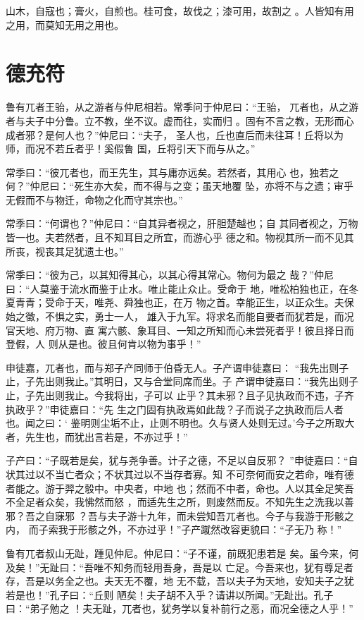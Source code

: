 \documentclass[a4paper,12pt,UTF8,twoside]{ctexbook}
\begin{document}
山木，自寇也；膏火，自煎也。桂可食，故伐之；漆可用，故割之 。人皆知有用之用，而莫知无用之用也。

\section{德充符}

鲁有兀者王骀，从之游者与仲尼相若。常季问于仲尼曰：“王骀， 兀者也，从之游者与夫子中分鲁。立不教，坐不议。虚而往，实而归 。固有不言之教，无形而心成者邪？是何人也？”仲尼曰：“夫子， 圣人也，丘也直后而未往耳！丘将以为师，而况不若丘者乎！奚假鲁 国，丘将引天下而与从之。”

常季曰：“彼兀者也，而王先生，其与庸亦远矣。若然者，其用心 也，独若之何？”仲尼曰：“死生亦大矣，而不得与之变；虽天地覆 坠，亦将不与之遗；审乎无假而不与物迁，命物之化而守其宗也。”

常季曰：“何谓也？”仲尼曰：“自其异者视之，肝胆楚越也；自 其同者视之，万物皆一也。夫若然者，且不知耳目之所宜，而游心乎 德之和。物视其所一而不见其所丧，视丧其足犹遗土也。”

常季曰：“彼为己，以其知得其心，以其心得其常心。物何为最之 哉？”仲尼曰：“人莫鉴于流水而鉴于止水。唯止能止众止。受命于 地，唯松柏独也正，在冬夏青青；受命于天，唯尧、舜独也正，在万 物之首。幸能正生，以正众生。夫保始之徵，不惧之实，勇士一人， 雄入于九军。将求名而能自要者而犹若是，而况官天地、府万物、直 寓六骸、象耳目、一知之所知而心未尝死者乎！彼且择日而登假，人 则从是也。彼且何肯以物为事乎！”

申徒嘉，兀者也，而与郑子产同师于伯昏无人。子产谓申徒嘉曰： “我先出则子止，子先出则我止。”其明日，又与合堂同席而坐。子 产谓申徒嘉曰：“我先出则子止，子先出则我止。今我将出，子可以 止乎？其未邪？且子见执政而不违，子齐执政乎？”申徒嘉曰：“先 生之门固有执政焉如此哉？子而说子之执政而后人者也。闻之曰：‘ 鉴明则尘垢不止，止则不明也。久与贤人处则无过。’今子之所取大 者，先生也，而犹出言若是，不亦过乎！”

子产曰：“子既若是矣，犹与尧争善。计子之德，不足以自反邪？ ”申徒嘉曰：“自状其过以不当亡者众；不状其过以不当存者寡。知 不可奈何而安之若命，唯有德者能之。游于羿之彀中。中央者，中地 也；然而不中者，命也。人以其全足笑吾不全足者众矣，我怫然而怒 ，而适先生之所，则废然而反。不知先生之洗我以善邪？吾之自寐邪 ？吾与夫子游十九年，而未尝知吾兀者也。今子与我游于形骸之内， 而子索我于形骸之外，不亦过乎！”子产蹴然改容更貌曰：“子无乃 称！”

鲁有兀者叔山无趾，踵见仲尼。仲尼曰：“子不谨，前既犯患若是 矣。虽今来，何及矣！”无趾曰：“吾唯不知务而轻用吾身，吾是以 亡足。今吾来也，犹有尊足者存，吾是以务全之也。夫天无不覆，地 无不载，吾以夫子为天地，安知夫子之犹若是也！”孔子曰：“丘则 陋矣！夫子胡不入乎？请讲以所闻。”无趾出。孔子曰：“弟子勉之 ！夫无趾，兀者也，犹务学以复补前行之恶，而况全德之人乎！”
\end{document}
